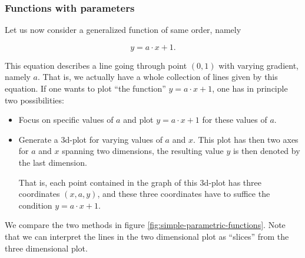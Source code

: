 \documentclass{article}
\begin{document}
\subsubsection{Functions with parameters}

Let us now consider a generalized function of same order, namely

\begin{equation*}
  y = a\cdot x+1.
\end{equation*}

This equation describes a line going through point $(0,1)$ with varying gradient, namely $a$. That is, we actually have a whole collection of lines given by this equation. If one wants to plot ``the function'' $y=a\cdot x + 1$, one has in principle two possibilities:

\begin{itemize}
\item Focus on specific values of $a$ and plot $y=a\cdot x + 1$ for these values of $a$.
\item Generate a 3d-plot for varying values of $a$ and $x$. This plot has then two axes for $a$ and $x$ spanning two dimensions, the resulting value $y$ is then denoted by the last dimension.

  That is, each point contained in the graph of this 3d-plot has three coordinates $(x,a,y)$, and these three coordinates have to suffice the condition $y=a\cdot x + 1$.
\end{itemize}

We compare the two methods in figure \ref{fig:simple-parametric-functions}. Note that we can interpret the lines in the two dimensional plot as ``slices'' from the three dimensional plot.
\end{document}
